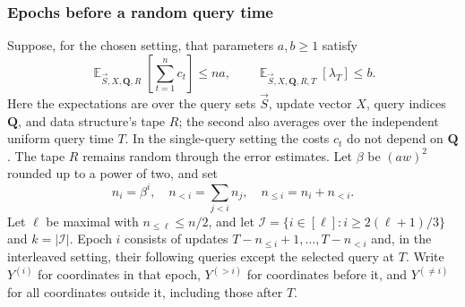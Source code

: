 \documentclass[11pt]{article}
\theoremstyle{plain}
\newcommand{\E}{\mathop{\mathbb{E}}}
\newcommand{\cI}{\mathcal{I}}
\newcommand{\vS}{\vec{S}}
\begin{document}
\subsubsection{Epochs before a random query time}\label{sec:epochs}
Suppose, for the chosen setting, that parameters $a,b\ge1$ satisfy
\begin{equation}\label{eq:costs}
 \E_{\vS,X,\mathbf Q,R}\!\left[\sum_{t=1}^n c_t\right]\le na,
 \qquad \E_{\vS,X,\mathbf Q,R,T}[\lambda_T]\le b.
\end{equation}
Here the expectations are over the query sets $\vS$, update vector $X$,
query indices $\mathbf Q$, and data structure's tape $R$; the second
also averages over the independent uniform query time $T$.
In the single-query setting the costs $c_t$ do not depend on $\mathbf Q$.
The tape $R$ remains random through the error estimates.
Let $\beta$ be $(aw)^2$ rounded
up to a power of two, and set
\[
 n_i=\beta^i,\quad
 n_{<i}=\sum_{j<i}n_j,\quad n_{\le i}=n_i+n_{<i}.
\]
Let $\ell$ be maximal with $n_{\le\ell}\le n/2$,
and let $\cI=\{i\in[\ell]:i\ge2(\ell+1)/3\}$ and $k=|\cI|$.
Epoch $i$ consists of updates $T-n_{\le i}+1,\ldots,T-n_{<i}$ and,
in the interleaved setting, their following queries except the
selected query at $T$. Write $Y^{(i)}$ for coordinates in that epoch,
$Y^{(>i)}$ for coordinates before it, and $Y^{(\ne i)}$ for all
coordinates outside it, including those after $T$.
\end{document}
